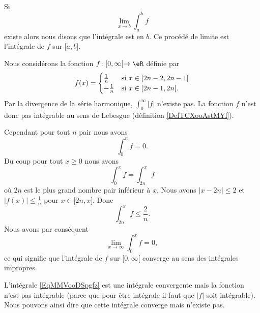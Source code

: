 \begin{definition}
    Si
    \begin{equation}
        \lim_{x\to b} \int_a^bf
    \end{equation}
    existe alors nous disons que l'intégrale est  en \( b\). Ce procédé de limite est l'intégrale  de \( f\) sur \( \mathopen[ a , b \mathclose]\).
\end{definition}

\begin{example}
    Nous considérons la fonction \( f\colon \mathopen[ 0 , \infty [\to \eR\) définie par
    \begin{equation}
        f(x)=\begin{cases}
            \frac{1}{ n }    &   \text{si \( x\in\mathopen[ 2n-2 , 2n-1 [\)}\\
                -\frac{1}{ n }    &    \text{si \( x\in\mathopen[ 2n-1 , 2n [\).}
        \end{cases}
    \end{equation}
    Par la divergence de la série harmonique, \( \int_{0}^{\infty}| f |\) n'existe pas. La fonction \( f\) n'est donc pas intégrable au sens de Lebesgue (définition \ref{DefTCXooAstMYl}).

    Cependant pour tout \( n\) pair nous avons
    \begin{equation}
        \int_0^nf=0.
    \end{equation}
    Du coup pour tout \( x\geq 0\) nous avons
    \begin{equation}
        \int_0^xf=\int_{2n}^xf
    \end{equation}
    où \( 2n\) est le plus grand nombre pair inférieur à \( x\). Nous avons \( | x-2n |\leq 2\) et \( | f(x) |\leq \frac{1}{ n }\) pour \( x\in\mathopen[ 2n , x \mathclose]\). Donc
    \begin{equation}
        \int_{2n}^xf\leq \frac{ 2 }{ n }.
    \end{equation}
    Nous avons par conséquent
    \begin{equation}
        \lim_{x\to \infty} \int_0^xf=0,
    \end{equation}
    ce qui signifie que l'intégrale de \( f\) sur \( \mathopen[ 0 , \infty [\) converge au sens des intégrales impropres.
\end{example}


L'intégrale \eqref{EqMMVooDSpgfz} est une intégrale convergente mais la fonction n'est pas intégrable (parce que pour être intégrale il faut que \( | f |\) soit intégrable). Nous pouvons ainsi dire que cette intégrale converge mais n'existe pas.

